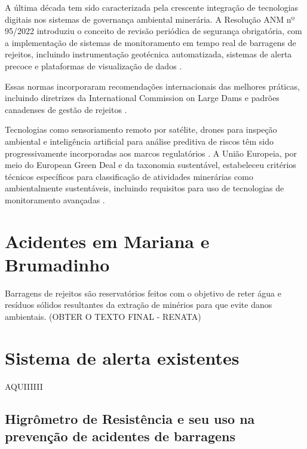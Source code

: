 A última década tem sido caracterizada pela crescente integração de tecnologias digitais nos sistemas de governança ambiental minerária. A Resolução ANM nº 95/2022 introduziu o conceito de revisão periódica de segurança obrigatória, com a implementação de sistemas de monitoramento em tempo real de barragens de rejeitos, incluindo instrumentação geotécnica automatizada, sistemas de alerta precoce e plataformas de visualização de dados \cite{anm2022resolucao95}.

Essas normas incorporaram recomendações internacionais das melhores práticas, incluindo diretrizes da International Commission on Large Dams \cite{icold2022tailings} e padrões canadenses de gestão de rejeitos \cite{mac2021guide}.

Tecnologias como sensoriamento remoto por satélite, drones para inspeção ambiental e inteligência artificial para análise preditiva de riscos têm sido progressivamente incorporadas aos marcos regulatórios \cite{darzi2024transformacao}. A União Europeia, por meio do European Green Deal e da taxonomia sustentável, estabeleceu critérios técnicos específicos para classificação de atividades minerárias como ambientalmente sustentáveis, incluindo requisitos para uso de tecnologias de monitoramento avançadas \cite{eu2020taxonomy}.

\section{Acidentes em Mariana e Brumadinho}
\label{sec:acidentes}

Barragens de rejeitos são reservatórios feitos com o objetivo de reter
água e resíduos sólidos resultantes da extração de minérios para que
evite danos ambientais. (OBTER O TEXTO FINAL - RENATA)

\section{Sistema de alerta existentes}
\label{sec:sistema_alerta}

AQUIIIIII

\subsection{Higrômetro de Resistência e seu uso na prevenção de acidentes de barragens}
\label{subsec:higrometro}